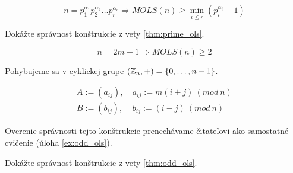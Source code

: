 \begin{corollary}
$$n = p_1^{\alpha_1} p_2^{\alpha_2} \ldots p_r^{\alpha_r} \Rightarrow MOLS(n) \geq \min_{i \leq r} (p_i^{\alpha_i} - 1)$$
\end{corollary}

\begin{toreview}
\begin{exercise}
\label{ex: prime_ols}
Dokážte správnosť konštrukcie z vety \ref{thm:prime_ols}.
\end{exercise}
\end{toreview}

\begin{theorem}
\label{thm:odd_ols}
$$n = 2m - 1 \Rightarrow MOLS(n) \geq 2$$
\end{theorem}

\begin{construction}

Pohybujeme sa v cyklickej grupe $(\mathbb{Z}_n, +) = \left\{0, \ldots, n-1\right\}$.

\begin{align*}
A := (a_{ij}),~& a_{ij} := m (i+j)~(mod~n) \\
B := (b_{ij}),~& b_{ij} := (i-j)  ~(mod~n)    
\end{align*}

Overenie správnosti tejto konštrukcie prenechávame čitateľovi ako samostatné cvičenie (úloha \ref{ex:odd_ols}).
\end{construction}

\begin{toreview}
\begin{exercise}
\label{ex:odd_ols}
Dokážte správnosť konštrukcie z vety \ref{thm:odd_ols}.
\end{exercise}
\end{toreview}